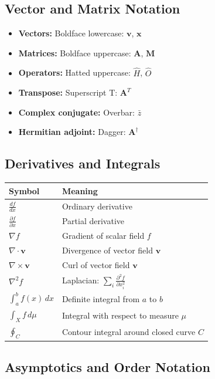 \subsection*{Vector and Matrix Notation}

\begin{itemize}
\item \textbf{Vectors:} Boldface lowercase: $\mathbf{v}$, $\mathbf{x}$
\item \textbf{Matrices:} Boldface uppercase: $\mathbf{A}$, $\mathbf{M}$
\item \textbf{Operators:} Hatted uppercase: $\hat{H}$, $\hat{O}$
\item \textbf{Transpose:} Superscript T: $\mathbf{A}^T$
\item \textbf{Complex conjugate:} Overbar: $\bar{z}$
\item \textbf{Hermitian adjoint:} Dagger: $\mathbf{A}^\dagger$
\end{itemize}

\subsection*{Derivatives and Integrals}

\begin{center}
\begin{tabular}{ll}
\toprule
\textbf{Symbol} & \textbf{Meaning} \\
\midrule
$\frac{df}{dx}$ & Ordinary derivative \\
$\frac{\partial f}{\partial x}$ & Partial derivative \\
$\nabla f$ & Gradient of scalar field $f$ \\
$\nabla \cdot \mathbf{v}$ & Divergence of vector field $\mathbf{v}$ \\
$\nabla \times \mathbf{v}$ & Curl of vector field $\mathbf{v}$ \\
$\nabla^2 f$ & Laplacian: $\sum_i \frac{\partial^2 f}{\partial x_i^2}$ \\
$\int_a^b f(x)\,dx$ & Definite integral from $a$ to $b$ \\
$\int_X f\,d\mu$ & Integral with respect to measure $\mu$ \\
$\oint_C$ & Contour integral around closed curve $C$ \\
\bottomrule
\end{tabular}
\end{center}

\subsection*{Asymptotics and Order Notation}

